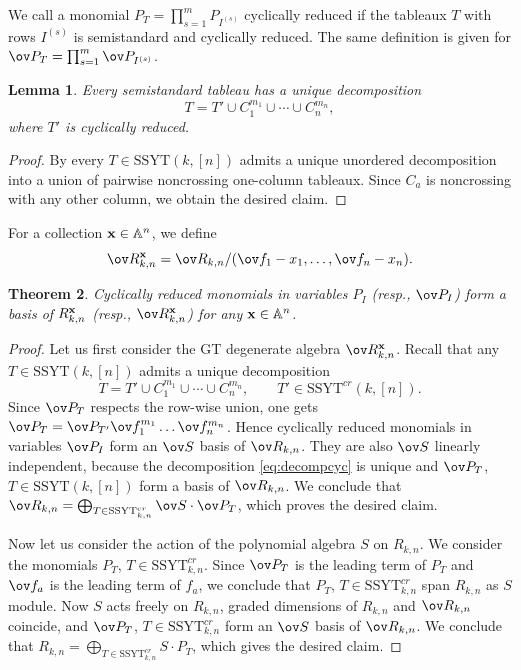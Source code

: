 \documentclass[11pt]{amsart}
\numberwithin{equation}{section}
\newtheorem{thm}{Theorem}[section]
\newtheorem{lem}[thm]{Lemma}
\newcommand{\bA}{{\mathbb A}}
\newcommand{\bfx}{{\bf x}}
\newcommand{\SSYT}{\mathrm{SSYT}}
\begin{document}
We call a monomial $P_T = \prod_{s=1}^m P_{I^{(s)}}$ cyclically reduced if the 
tableaux $T$ with rows $I^{(s)}$ is semistandard and cyclically reduced. 
The same definition is given for  $\ov P_T = \prod_{s=1}^m \ov P_{I^{(s)}}$.

\begin{lem}
Every semistandard tableau has a
unique decomposition
\[
T=T'\cup C_1^{m_1}\cup\cdots\cup C_n^{m_n},
\]
where $T'$ is cyclically reduced.
\end{lem}
\begin{proof}
By \cite{EL25} every $T\in \SSYT(k,[n])$ admits a unique unordered  decomposition into a union of 
pairwise noncrossing one-column tableaux. Since $C_a$ is noncrossing with any other column, we obtain the desired claim.
\end{proof}

For a collection $\bfx\in\bA^n$, we define 
\[
\ov R_{k,n}^{\bfx}
=
\ov R_{k,n}/(\ov f_1-x_1,\ldots,\ov f_n-x_n).
\]

\begin{thm}
Cyclically reduced monomials in variables $P_I$ (resp., $\ov P_I$) form a basis
of $R^\bfx_{k,n}$ (resp., $\ov R^\bfx_{k,n}$) for any $\bfx\in\bA^n$.
\end{thm}
\begin{proof}
Let us first consider the GT degenerate algebra $\ov R^\bfx_{k,n}$. Recall that 
any $T\in \SSYT(k,[n])$ admits a unique decomposition 
\begin{equation}\label{eq:decompcyc}
T = T'\cup C_1^{m_1}\cup\cdots\cup C_n^{m_n}, \qquad T'\in\SSYT^{cr}(k,[n]).
\end{equation}
Since $\ov P_T$ respects the row-wise union, one gets 
$\ov P_T = \ov P_{T'}\ov f_1^{m_1}\dots \ov f_n^{m_n}$. Hence cyclically reduced 
monomials in variables $\ov P_I$ form an $\ov S$ basis of $\ov R_{k,n}$.
They are also $\ov S$ linearly independent, because the decomposition \eqref{eq:decompcyc}
is unique and $\ov P_T$, $T\in\SSYT(k,[n])$ form a basis of $\ov R_{k,n}$. We conclude 
that $\ov R_{k,n} = \bigoplus_{T\in\SSYT^{cr}_{k,n}} \ov S\cdot \ov P_T$, which proves
the desired claim.

Now let us consider the action of the polynomial algebra $S$ on $R_{k,n}$. We consider 
the monomials $P_T$, $T\in\SSYT^{cr}_{k,n}$. Since $\ov P_T$ is the leading term
of $P_T$ and $\ov f_a$ is the leading term of $f_a$, we conclude that $P_T$, 
$T\in\SSYT^{cr}_{k,n}$ span $R_{k,n}$ as $S$ module. Now $S$ acts freely on $R_{k,n}$,
graded dimensions of $R_{k,n}$ and $\ov R_{k,n}$ coincide, and  $\ov P_T$, 
$T\in\SSYT^{cr}_{k,n}$ form an $\ov S$ basis of $\ov R_{k,n}$. We conclude that 
$R_{k,n} = \bigoplus_{T\in\SSYT^{cr}_{k,n}} S\cdot P_T$, which gives the 
desired claim.
\end{proof}
\end{document}
